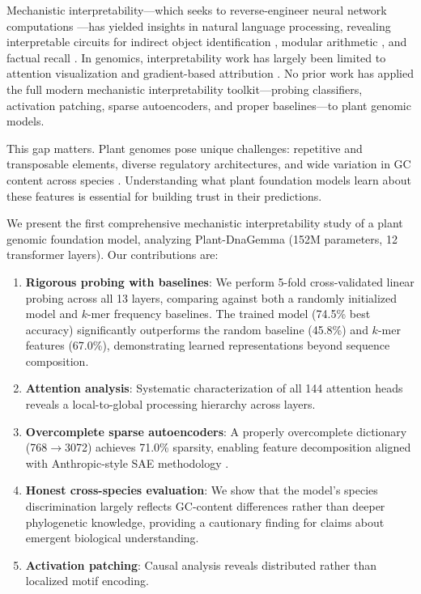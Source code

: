 \documentclass{article}
\begin{document}
Mechanistic interpretability---which seeks to reverse-engineer neural network computations \citep{elhage2022toy, olah2020zoom, conmy2023towards}---has yielded insights in natural language processing, revealing interpretable circuits for indirect object identification \citep{wang2023interpretability}, modular arithmetic \citep{neel2023grokking}, and factual recall \citep{meng2022locating}. In genomics, interpretability work has largely been limited to attention visualization and gradient-based attribution \citep{clauwaert2021explainability, avsec2021effective, yu2024plantrna}. No prior work has applied the full modern mechanistic interpretability toolkit---probing classifiers, activation patching, sparse autoencoders, and proper baselines---to plant genomic models.

This gap matters. Plant genomes pose unique challenges: repetitive and transposable elements, diverse regulatory architectures, and wide variation in GC content across species \citep{schnable2009maize, arabidopsis2000analysis}. Understanding what plant foundation models learn about these features is essential for building trust in their predictions.

We present the first comprehensive mechanistic interpretability study of a plant genomic foundation model, analyzing Plant-DnaGemma (152M parameters, 12 transformer layers). Our contributions are:

\begin{enumerate}
    \item \textbf{Rigorous probing with baselines}: We perform 5-fold cross-validated linear probing across all 13 layers, comparing against both a randomly initialized model and $k$-mer frequency baselines. The trained model (74.5\% best accuracy) significantly outperforms the random baseline (45.8\%) and $k$-mer features (67.0\%), demonstrating learned representations beyond sequence composition.
    \item \textbf{Attention analysis}: Systematic characterization of all 144 attention heads reveals a local-to-global processing hierarchy across layers.
    \item \textbf{Overcomplete sparse autoencoders}: A properly overcomplete dictionary (768$\to$3072) achieves 71.0\% sparsity, enabling feature decomposition aligned with Anthropic-style SAE methodology \citep{bricken2023monosemanticity, templeton2024scaling}.
    \item \textbf{Honest cross-species evaluation}: We show that the model's species discrimination largely reflects GC-content differences rather than deeper phylogenetic knowledge, providing a cautionary finding for claims about emergent biological understanding.
    \item \textbf{Activation patching}: Causal analysis reveals distributed rather than localized motif encoding.
\end{enumerate}
\end{document}
